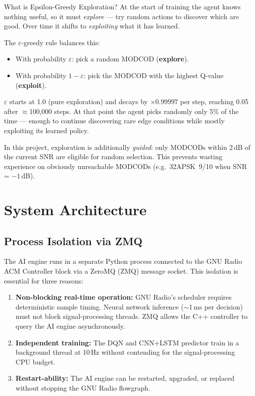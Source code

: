 \documentclass[12pt,a4paper]{report}
\begin{document}
\begin{conceptbox}{What is Epsilon-Greedy Exploration?}
At the start of training the agent knows nothing useful, so it must
\emph{explore} --- try random actions to discover which are good.
Over time it shifts to \emph{exploiting} what it has learned.

The $\varepsilon$-greedy rule balances this:
\begin{itemize}[nosep,leftmargin=*]
  \item With probability $\varepsilon$: pick a random MODCOD (\textbf{explore}).
  \item With probability $1-\varepsilon$: pick the MODCOD with the highest
        Q-value (\textbf{exploit}).
\end{itemize}
$\varepsilon$ starts at 1.0 (pure exploration) and decays by
$\times 0.99997$ per step, reaching 0.05 after $\approx$100,000 steps.
At that point the agent picks randomly only 5\% of the time --- enough to
continue discovering rare edge conditions while mostly exploiting its
learned policy.

In this project, exploration is additionally \emph{guided}: only MODCODs
within 2\,dB of the current SNR are eligible for random selection.
This prevents wasting experience on obviously unreachable MODCODs
(e.g.\ 32APSK~9/10 when SNR = $-1$\,dB).
\end{conceptbox}

\section{System Architecture}

\subsection{Process Isolation via ZMQ}

The AI engine runs in a separate Python process connected to the GNU Radio
ACM Controller block via a ZeroMQ (ZMQ) message socket. This isolation is
essential for three reasons:

\begin{enumerate}
    \item \textbf{Non-blocking real-time operation:} GNU Radio's scheduler
          requires deterministic sample timing. Neural network inference
          ($\sim$1\,ms per decision) must not block signal-processing threads.
          ZMQ allows the C++ controller to query the AI engine asynchronously.
    \item \textbf{Independent training:} The DQN and CNN+LSTM predictor train
          in a background thread at 10\,Hz without contending for the
          signal-processing CPU budget.
    \item \textbf{Restart-ability:} The AI engine can be restarted, upgraded,
          or replaced without stopping the GNU Radio flowgraph.
\end{enumerate}
\end{document}
